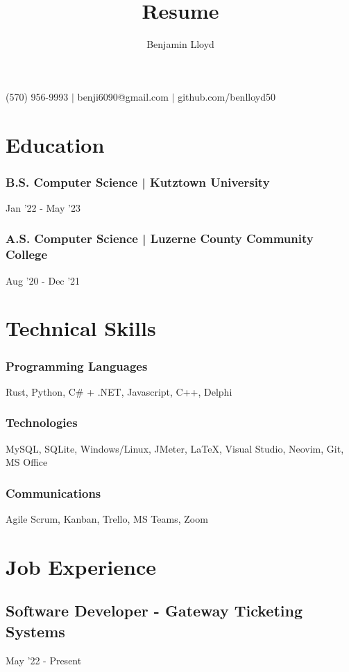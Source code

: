 \documentclass{article}
\makeatletter
\renewcommand{\maketitle}{
\begin{center}
{\huge\bfseries\theauthor}

\vspace{.25em}

(570) 956-9993 $\vert$ benji6090@gmail.com $\vert$ github.com/benlloyd50

\end{center}
}
\makeatother
\begin{document}
\title{Resume}

\author{Benjamin Lloyd}

\maketitle

\section{Education}
\subsubsection{B.S. Computer Science | Kutztown University} \hfill Jan '22 - May '23

\subsubsection{A.S. Computer Science | Luzerne County Community College} \hfill Aug '20 - Dec '21


\section{Technical Skills}

\subsubsection{Programming Languages} Rust, Python, C\# + .NET, Javascript, C++, Delphi

\subsubsection{Technologies} MySQL, SQLite, Windows/Linux, JMeter, {\LaTeX}, Visual Studio, Neovim, Git, MS Office

\subsubsection{Communications} Agile Scrum, Kanban, Trello, MS Teams, Zoom

\section{Job Experience}
\subsection{Software Developer - Gateway Ticketing Systems} \hfill May '22 - Present
\end{document}
